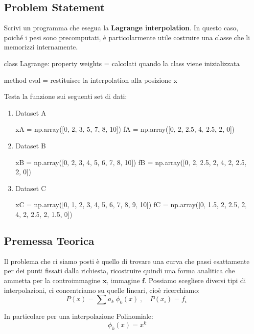 \documentclass[11pt, a4paper]{article}
\begin{document}
\subsection{Problem Statement}
Scrivi un programma che esegua la \textbf{Lagrange interpolation}. In questo caso, poiché i pesi sono precomputati, è particolarmente utile costruire una classe che li memorizzi internamente.

\begin{elegantcode}[title=Schema della classe Lagrange]
class Lagrange:
    property weights = calcolati quando la class viene inizializzata
    
    method eval = restituisce la interpolation alla posizione x
\end{elegantcode}

Testa la funzione sui seguenti set di dati:
\begin{enumerate}
    \item Dataset A
    \begin{elegantcode}
xA = np.array([0, 2, 3, 5, 7, 8, 10])
fA = np.array([0, 2, 2.5, 4, 2.5, 2, 0])
    \end{elegantcode}
    
    \item Dataset B
    \begin{elegantcode}
xB = np.array([0, 2, 3, 4, 5, 6, 7, 8, 10])
fB = np.array([0, 2, 2.5, 2, 4, 2, 2.5, 2, 0])
    \end{elegantcode}
    
    \item Dataset C
    \begin{elegantcode}
xC = np.array([0, 1, 2, 3, 4, 5, 6, 7, 8, 9, 10])
fC = np.array([0, 1.5, 2, 2.5, 2, 4, 2, 2.5, 2, 1.5, 0])
    \end{elegantcode}
\end{enumerate}

\subsection{Premessa Teorica}
Il problema che ci siamo posti è quello di trovare una curva che passi esattamente per dei punti fissati dalla richiesta, ricostruire quindi una forma analitica che ammetta per la controimmagine $\boldsymbol{x}$, immagine $\boldsymbol f$. Possiamo scegliere diversi tipi di interpolazioni, ci concentriamo su quelle lineari, cioè ricerchiamo:
\[
P(x) = \sum a_k\ \phi_k(x)\ , \quad P(x_i) = f_i\
\]

\noindent In particolare per una interpolazione Polinomiale:
\[
\phi_k(x) = x^k
\]
\end{document}
